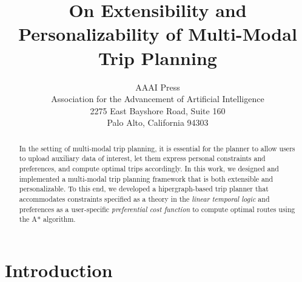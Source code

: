 \documentclass[letterpaper]{article}
\newcommand{\tit}[1]{\textit{#1}}
\begin{document}
%
\title{On Extensibility and Personalizability of Multi-Modal Trip Planning}
\author{AAAI Press\\
Association for the Advancement of Artificial Intelligence\\
2275 East Bayshore Road, Suite 160\\
Palo Alto, California 94303\\
}
\maketitle
\begin{abstract}
	In the setting of multi-modal trip planning, it is essential for
	the planner to allow users to upload auxiliary data of interest,
	let them express personal constraints and preferences,
	and compute optimal trips accordingly.
	In this work, we designed and implemented a multi-modal trip
	planning framework that is both extensible and personalizable.
	To this end, we developed a hipergraph-based trip planner that 
	accommodates constraints specified as a theory in the 
	\tit{linear temporal logic} and preferences as a 
	user-specific \tit{preferential cost function} 
	to compute optimal routes using the A* algorithm.
\end{abstract}

\section{Introduction}
\end{document}
